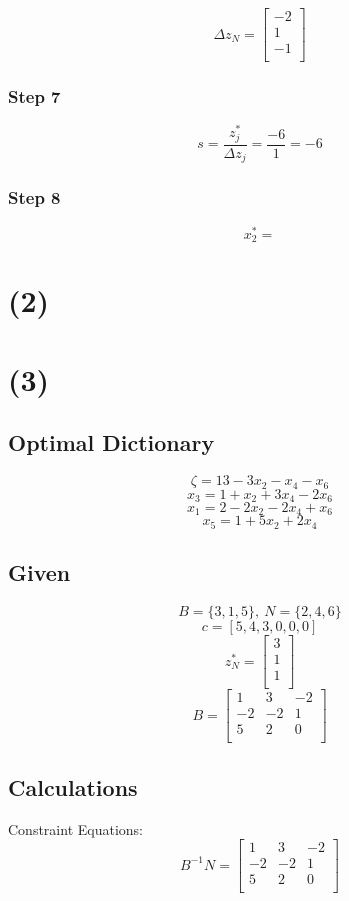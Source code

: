\documentclass[14pt]{extarticle}
\begin{document}
\[
    \Delta z_N =
    \begin{bmatrix}
        -2 \\
        1 \\
        -1 \\
    \end{bmatrix}
\]

\subsubsection*{Step 7}
\[
    s = \frac{z^*_j}{\Delta z_j} = \frac{-6}{1} = -6
\]

\subsubsection*{Step 8}
\[
    x^*_2 = 
\]

\section*{(2)}

\section*{(3)}
\subsection*{Optimal Dictionary}
\[
    \zeta = 13-3x_2-x_4-x_6
\]
\[
    x_3 = 1+x_2+3x_4-2x_6
\]
\[
    x_1 = 2-2x_2-2x_4+x_6
\]
\[
    x_5 = 1+5x_2+2x_4
\]

\subsection*{Given}
\[
    B = \{3, 1, 5\},\ N = \{2, 4, 6\}
\]
\[
    c = [5, 4, 3, 0, 0, 0]
\]
\[
    z^*_N = \begin{bmatrix}
        3 \\
        1 \\
        1 \\
    \end{bmatrix}
\]
\[
    B = \begin{bmatrix}
        1 & 3 & -2 \\
        -2 & -2 & 1 \\
        5 & 2 & 0 \\
    \end{bmatrix}
\]

\subsection*{Calculations}
Constraint Equations:
\[
    B^{-1}N = \begin{bmatrix}
        1 & 3 & -2 \\
        -2 & -2 & 1 \\
        5 & 2 & 0 \\
    \end{bmatrix}
\]
\end{document}
